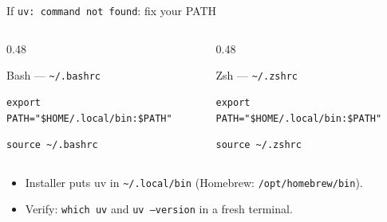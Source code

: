 \documentclass[aspectratio=169]{beamer}
\begin{document}
\begin{frame}[fragile]{If \texttt{uv: command not found}: fix your PATH}
  \begin{columns}[T]
    \begin{column}{0.48\textwidth}
      \begin{block}{Bash --- \texttt{\textasciitilde/.bashrc}}
        \begin{lstlisting}
export PATH="$HOME/.local/bin:$PATH"
        \end{lstlisting}
        \begin{lstlisting}
source ~/.bashrc
        \end{lstlisting}
      \end{block}
    \end{column}
    \begin{column}{0.48\textwidth}
      \begin{block}{Zsh --- \texttt{\textasciitilde/.zshrc}}
        \begin{lstlisting}
export PATH="$HOME/.local/bin:$PATH"
        \end{lstlisting}
        \begin{lstlisting}
source ~/.zshrc
        \end{lstlisting}
      \end{block}
    \end{column}
  \end{columns}
  \vspace{0.2cm}
  \begin{itemize}
    \item Installer puts uv in \texttt{\textasciitilde/.local/bin} (Homebrew: \texttt{/opt/homebrew/bin}).
    \item Verify: \texttt{which uv} and \texttt{uv --version} in a fresh terminal.
  \end{itemize}
\end{frame}
\end{document}

